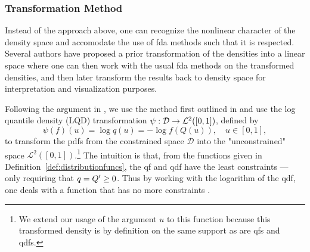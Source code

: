 \subsubsection{Transformation Method}
\label{sec:transformation_interpretation}
Instead of the approach above, one can recognize the nonlinear character of the density
space and accomodate the use of fda methods such that it is respected. Several authors
have proposed a prior transformation of the densities into a linear space
\parencites[e.g.][]{Hron2016}[][]{PetersenMüller2016} where one can then work with the
usual fda methods on the transformed densities, and then later transform the results
back to density space for interpretation and visualization purposes.

Following the argument in \textcite{KokoszkaEtAl2019}, we use the method first outlined
in \textcite{PetersenMüller2016} and use the log quantile density (LQD) transformation
$\psi : \nobreak \mathcal{D} \to \mathcal{L}^2([0,1])$, defined by
\begin{equation}
    \label{eq:lqd_definition}
    \psi (f)(u) = \log q(u) = -\log f(Q(u)), \quad u \in [0,1],
\end{equation}
to transform the pdfs from the constrained space $\mathcal{D}$ into the "unconstrained"
space $\mathcal{L}^2([0,1])$.\footnote{We extend our usage of the argument $u$ to this
function because this transformed density is by definition on the same support as are
qfs and qdfs.} The intuition is that, from the functions given in
Definition~\ref{def:distributionfuncs}, the qf and qdf have the least constraints ---
only requiring that $q = \nobreak Q' \geq \nobreak 0$. Thus by working with the logarithm
of the qdf, one deals with a function that has no more constraints \parencite[cf.][]{KokoszkaEtAl2019}.

